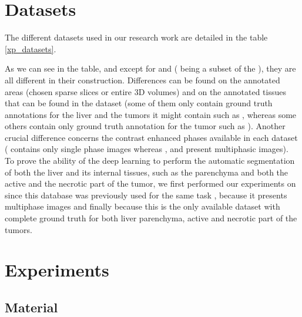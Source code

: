 \section{Datasets}

The different datasets used in our research work are detailed in the
table \ref{xp_datasets}.



As we can see in the table, and except for \textbf{} and \textbf{}
(\textbf{} being a subset of the \textbf{} \cite{Bilic2019}), they are all different in their construction. Differences can
be found on the annotated areas (chosen sparse slices or entire 3D
volumes) and on the annotated tissues that can be found in the dataset
(some of them only contain ground truth annotations for the liver and
the tumors it might contain such as \textbf{}, whereas some others contain
only ground truth annotation for the tumor such as \textbf{}). Another
crucial difference concerns the contrast enhanced phases available in
each dataset (\textbf{} contains only single phase images whereas \textbf{},
\textbf{} and \textbf{} present multiphasic images). \\
To prove the ability of the deep learning to perform the automatic
segmentation of both the liver and its internal tissues, such as the
parenchyma and both the active and the necrotic part of the tumor, we
first performed our experiments on \textbf{} since this database was
previously used for the same task \cite{Conze2017}, because it
presents multiphase images and finally because this is the only
available dataset with complete ground truth for both liver parenchyma,
active and necrotic part of the tumors. \\


\section{Experiments}

\subsection{Material}

